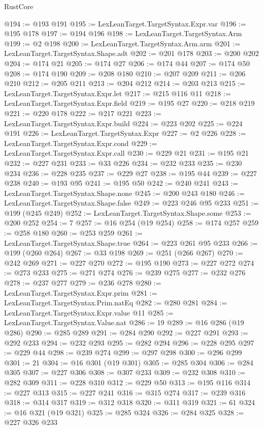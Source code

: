 \begin{lexlean}{RustCore}
\begin{coremodule}
@194 := @193 @191
@195 := LexLeanTarget.TargetSyntax.Expr.var
@196 := @195 @178
@197 := @194 @196
@198 := LexLeanTarget.TargetSyntax.Arm
@199 := @2 @198
@200 := LexLeanTarget.TargetSyntax.Arm.arm
@201 := LexLeanTarget.TargetSyntax.Shape.adt
@202 := @201 @178
@203 := @200 @202
@204 := @174 @21
@205 := @174 @27
@206 := @174 @44
@207 := @174 @50
@208 := @174 @190
@209 := @208 @180
@210 := @207 @209
@211 := @206 @210
@212 := @205 @211
@213 := @204 @212
@214 := @203 @213
@215 := LexLeanTarget.TargetSyntax.Expr.let
@217 := @215 @116 @11
@218 := LexLeanTarget.TargetSyntax.Expr.field
@219 := @195 @27
@220 := @218 @219
@221 := @220 @178
@222 := @217 @221
@223 := LexLeanTarget.TargetSyntax.Expr.build
@224 := @223 @202
@225 := @224 @191
@226 := LexLeanTarget.TargetSyntax.Expr
@227 := @2 @226
@228 := LexLeanTarget.TargetSyntax.Expr.cond
@229 := LexLeanTarget.TargetSyntax.Expr.call
@230 := @229 @21
@231 := @195 @21
@232 := @227 @231
@233 := @33 @226
@234 := @232 @233
@235 := @230 @234
@236 := @228 @235
@237 := @229 @27
@238 := @195 @44
@239 := @227 @238
@240 := @193 @95
@241 := @195 @50
@242 := @240 @241
@243 := LexLeanTarget.TargetSyntax.Shape.none
@245 := @200 @243 @180
@246 := LexLeanTarget.TargetSyntax.Shape.false
@249 := @223 @246 @95 @233
@251 := @199 (@245 @249)
@252 := LexLeanTarget.TargetSyntax.Shape.some
@253 := @200 @252
@254 := 7
@257 := @16 @254 (@19 @254)
@258 := @174 @257
@259 := @258 @180
@260 := @253 @259
@261 := LexLeanTarget.TargetSyntax.Shape.true
@264 := @223 @261 @95 @233
@266 := @199 (@260 @264)
@267 := @33 @198
@269 := @251 (@266 @267)
@270 := @242 @269
@271 := @227 @270
@272 := @195 @190
@273 := @227 @272
@274 := @273 @233
@275 := @271 @274
@276 := @239 @275
@277 := @232 @276
@278 := @237 @277
@279 := @236 @278
@280 := LexLeanTarget.TargetSyntax.Expr.prim
@281 := LexLeanTarget.TargetSyntax.Prim.natEq
@282 := @280 @281
@284 := LexLeanTarget.TargetSyntax.Expr.value @11
@285 := LexLeanTarget.TargetSyntax.Value.nat
@286 := 19
@289 := @16 @286 (@19 @286)
@290 := @285 @289
@291 := @284 @290
@292 := @227 @291
@293 := @292 @233
@294 := @232 @293
@295 := @282 @294
@296 := @228 @295
@297 := @229 @44
@298 := @239 @274
@299 := @297 @298
@300 := @296 @299
@301 := 21
@304 := @16 @301 (@19 @301)
@305 := @285 @304
@306 := @284 @305
@307 := @227 @306
@308 := @307 @233
@309 := @232 @308
@310 := @282 @309
@311 := @228 @310
@312 := @229 @50
@313 := @195 @116
@314 := @227 @313
@315 := @227 @241
@316 := @315 @274
@317 := @239 @316
@318 := @314 @317
@319 := @312 @318
@320 := @311 @319
@321 := 61
@324 := @16 @321 (@19 @321)
@325 := @285 @324
@326 := @284 @325
@328 := @227 @326 @233

\end{coremodule}
\end{lexlean}
